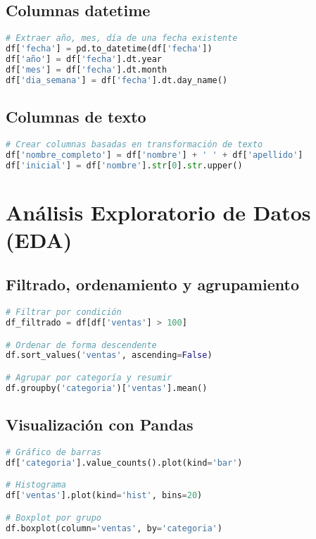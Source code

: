 \documentclass[11pt]{article}
\begin{document}
\subsection*{Columnas datetime}
\begin{lstlisting}[language=Python]
# Extraer año, mes, día de una fecha existente
df['fecha'] = pd.to_datetime(df['fecha'])
df['año'] = df['fecha'].dt.year
df['mes'] = df['fecha'].dt.month
df['dia_semana'] = df['fecha'].dt.day_name()
\end{lstlisting}

\subsection*{Columnas de texto}
\begin{lstlisting}[language=Python]
# Crear columnas basadas en transformación de texto
df['nombre_completo'] = df['nombre'] + ' ' + df['apellido']
df['inicial'] = df['nombre'].str[0].str.upper()
\end{lstlisting}

\section*{Análisis Exploratorio de Datos (EDA)}

\subsection*{Filtrado, ordenamiento y agrupamiento}
\begin{lstlisting}[language=Python]
# Filtrar por condición
df_filtrado = df[df['ventas'] > 100]

# Ordenar de forma descendente
df.sort_values('ventas', ascending=False)

# Agrupar por categoría y resumir
df.groupby('categoria')['ventas'].mean()
\end{lstlisting}

\subsection*{Visualización con Pandas}
\begin{lstlisting}[language=Python]
# Gráfico de barras
df['categoria'].value_counts().plot(kind='bar')

# Histograma
df['ventas'].plot(kind='hist', bins=20)

# Boxplot por grupo
df.boxplot(column='ventas', by='categoria')
\end{lstlisting}
\end{document}
